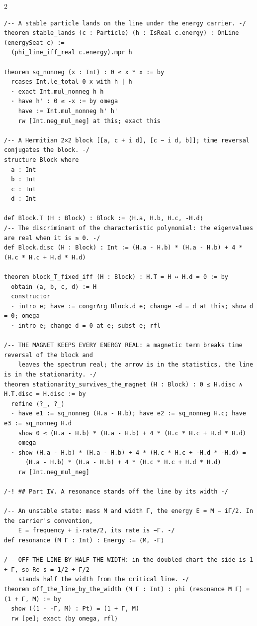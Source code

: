 \documentclass[10pt]{article}
\begin{document}
\begin{multicols}{2}
\begin{Verbatim}[fontsize=\fontsize{5.9}{6.8}\selectfont,breaklines,breakanywhere,breaksymbolleft={}]
/-- A stable particle lands on the line under the energy carrier. -/
theorem stable_lands (c : Particle) (h : IsReal c.energy) : OnLine (energySeat c) :=
  (phi_line_iff_real c.energy).mpr h

theorem sq_nonneg (x : Int) : 0 ≤ x * x := by
  rcases Int.le_total 0 x with h | h
  · exact Int.mul_nonneg h h
  · have h' : 0 ≤ -x := by omega
    have := Int.mul_nonneg h' h'
    rw [Int.neg_mul_neg] at this; exact this

/-- A Hermitian 2×2 block [[a, c + i d], [c − i d, b]]; time reversal conjugates the block. -/
structure Block where
  a : Int
  b : Int
  c : Int
  d : Int

def Block.T (H : Block) : Block := ⟨H.a, H.b, H.c, -H.d⟩
/-- The discriminant of the characteristic polynomial: the eigenvalues are real when it is ≥ 0. -/
def Block.disc (H : Block) : Int := (H.a - H.b) * (H.a - H.b) + 4 * (H.c * H.c + H.d * H.d)

theorem block_T_fixed_iff (H : Block) : H.T = H ↔ H.d = 0 := by
  obtain ⟨a, b, c, d⟩ := H
  constructor
  · intro e; have := congrArg Block.d e; change -d = d at this; show d = 0; omega
  · intro e; change d = 0 at e; subst e; rfl

/-- THE MAGNET KEEPS EVERY ENERGY REAL: a magnetic term breaks time reversal of the block and
    leaves the spectrum real; the arrow is in the statistics, the line is in the stationarity. -/
theorem stationarity_survives_the_magnet (H : Block) : 0 ≤ H.disc ∧ H.T.disc = H.disc := by
  refine ⟨?_, ?_⟩
  · have e1 := sq_nonneg (H.a - H.b); have e2 := sq_nonneg H.c; have e3 := sq_nonneg H.d
    show 0 ≤ (H.a - H.b) * (H.a - H.b) + 4 * (H.c * H.c + H.d * H.d)
    omega
  · show (H.a - H.b) * (H.a - H.b) + 4 * (H.c * H.c + -H.d * -H.d) =
      (H.a - H.b) * (H.a - H.b) + 4 * (H.c * H.c + H.d * H.d)
    rw [Int.neg_mul_neg]

/-! ## Part IV. A resonance stands off the line by its width -/

/-- An unstable state: mass M and width Γ, the energy E = M − iΓ/2. In the carrier's convention,
    E = frequency + i·rate/2, its rate is −Γ. -/
def resonance (M Γ : Int) : Energy := ⟨M, -Γ⟩

/-- OFF THE LINE BY HALF THE WIDTH: in the doubled chart the side is 1 + Γ, so Re s = 1/2 + Γ/2
    stands half the width from the critical line. -/
theorem off_the_line_by_the_width (M Γ : Int) : phi (resonance M Γ) = (1 + Γ, M) := by
  show ((1 - -Γ, M) : Pt) = (1 + Γ, M)
  rw [pe]; exact ⟨by omega, rfl⟩


\end{Verbatim}
\end{multicols}
\end{document}
